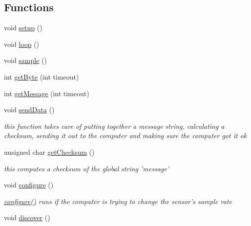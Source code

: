 \subsection*{Functions}
\begin{CompactItemize}
\item 
void \hyperlink{temperature__sensor___terciopelo_8pde_4fc01d736fe50cf5b977f755b675f11d}{setup} ()
\item 
void \hyperlink{temperature__sensor___terciopelo_8pde_fe461d27b9c48d5921c00d521181f12f}{loop} ()
\item 
void \hyperlink{temperature__sensor___terciopelo_8pde_50a2ce599e896bfb535e70a42003ed23}{sample} ()
\item 
int \hyperlink{temperature__sensor___terciopelo_8pde_f8c68e93feeba5b9244094043672bac0}{getByte} (int timeout)
\item 
int \hyperlink{temperature__sensor___terciopelo_8pde_8f2521044963073c55b3c290fffd79e3}{getMessage} (int timeout)
\item 
void \hyperlink{temperature__sensor___terciopelo_8pde_95b1b253ee46df6a93285803cf1f3370}{sendData} ()
\begin{CompactList}\small\item\em this function takes care of putting together a message string, calculating a checksum, sending it out to the computer and making sure the computer got it ok \item\end{CompactList}\item 
unsigned char \hyperlink{temperature__sensor___terciopelo_8pde_465a79dc430d1e52a5b540920da744ca}{getChecksum} ()
\begin{CompactList}\small\item\em this computes a checksum of the global string 'message' \item\end{CompactList}\item 
void \hyperlink{temperature__sensor___terciopelo_8pde_e369b3765489ee8bd0ea791c1843630f}{configure} ()
\begin{CompactList}\small\item\em \hyperlink{applet_2nublogger_8h_e369b3765489ee8bd0ea791c1843630f}{configure()} runs if the computer is trying to change the sensor's sample rate \item\end{CompactList}\item 
void \hyperlink{temperature__sensor___terciopelo_8pde_3fdb2350c3f98c0de0f0ae3c831a8b14}{discover} ()

\end{CompactItemize}
